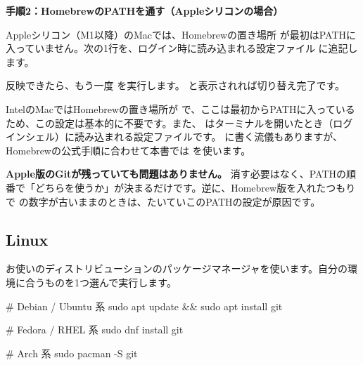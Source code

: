 \noindent\textbf{手順2：HomebrewのPATHを通す（Appleシリコンの場合）}

Appleシリコン（M1以降）のMacでは、Homebrewの置き場所  が最初はPATHに入っていません。次の1行を、ログイン時に読み込まれる設定ファイル  に追記します。

\begin{codebox}[bash]
\end{codebox}

反映できたら、もう一度  を実行します。 と表示されれば切り替え完了です。

\begin{notebox}
IntelのMacではHomebrewの置き場所が  で、ここは最初からPATHに入っているため、この設定は基本的に不要です。また、 はターミナルを開いたとき（ログインシェル）に読み込まれる設定ファイルです。 に書く流儀もありますが、Homebrewの公式手順に合わせて本書では  を使います。
\end{notebox}

\begin{warnbox}
\textbf{Apple版のGitが残っていても問題はありません。} 消す必要はなく、PATHの順番で「どちらを使うか」が決まるだけです。逆に、Homebrew版を入れたつもりで  の数字が古いままのときは、たいていこのPATHの設定が原因です。
\end{warnbox}

\subsection{Linux}
\label{sec:install-linux}

お使いのディストリビューションのパッケージマネージャを使います。自分の環境に合うものを1つ選んで実行します。

\begin{codebox}[bash]
\begin{code}
# Debian / Ubuntu 系
sudo apt update && sudo apt install git

# Fedora / RHEL 系
sudo dnf install git

# Arch 系
sudo pacman -S git
\end{code}
\end{codebox}

